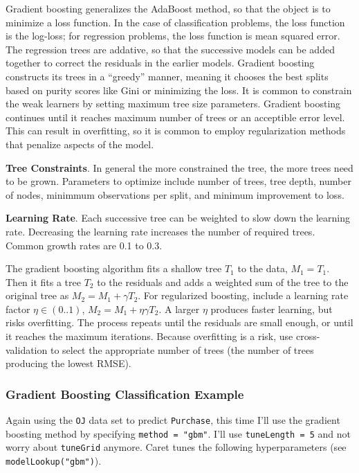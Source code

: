 \documentclass[
]{book}
\begin{document}
Gradient boosting generalizes the AdaBoost method, so that the object is to minimize a loss function. In the case of classification problems, the loss function is the log-loss; for regression problems, the loss function is mean squared error. The regression trees are addative, so that the successive models can be added together to correct the residuals in the earlier models. Gradient boosting constructs its trees in a ``greedy'' manner, meaning it chooses the best splits based on purity scores like Gini or minimizing the loss. It is common to constrain the weak learners by setting maximum tree size parameters. Gradient boosting continues until it reaches maximum number of trees or an acceptible error level. This can result in overfitting, so it is common to employ regularization methods that penalize aspects of the model.

\textbf{Tree Constraints}. In general the more constrained the tree, the more trees need to be grown. Parameters to optimize include number of trees, tree depth, number of nodes, minimmum observations per split, and minimum improvement to loss.

\textbf{Learning Rate}. Each successive tree can be weighted to slow down the learning rate. Decreasing the learning rate increases the number of required trees. Common growth rates are 0.1 to 0.3.

The gradient boosting algorithm fits a shallow tree \(T_1\) to the data, \(M_1 = T_1\). Then it fits a tree \(T_2\) to the residuals and adds a weighted sum of the tree to the original tree as \(M_2 = M_1 + \gamma T_2\). For regularized boosting, include a learning rate factor \(\eta \in (0..1)\), \(M_2 = M_1 + \eta \gamma T_2\). A larger \(\eta\) produces faster learning, but risks overfitting. The process repeats until the residuals are small enough, or until it reaches the maximum iterations. Because overfitting is a risk, use cross-validation to select the appropriate number of trees (the number of trees producing the lowest RMSE).

\hypertarget{gradient-boosting-classification-example}{%
\subsubsection{Gradient Boosting Classification Example}\label{gradient-boosting-classification-example}}

Again using the \texttt{OJ} data set to predict \texttt{Purchase}, this time I'll use the gradient boosting method by specifying \texttt{method\ =\ "gbm"}. I'll use \texttt{tuneLength\ =\ 5} and not worry about \texttt{tuneGrid} anymore. Caret tunes the following hyperparameters (see \texttt{modelLookup("gbm")}).
\end{document}
